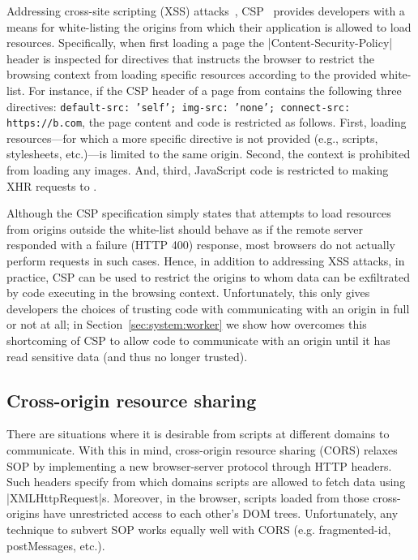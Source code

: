 Addressing cross-site scripting (XSS) attacks~,
CSP~ provides developers with a means for
white-listing the origins from which their application is allowed to
load resources.
%
Specifically, when first loading a page the
\js|Content-Security-Policy| header is inspected for directives that
instructs the browser to restrict the browsing context from loading
specific resources according to the provided white-list.
%
For instance, if the CSP header of a page from  contains
the following three directives:
%
\texttt{default-src: 'self'; img-src: 'none'; connect-src:
https://b.com},
%
the page content and code is restricted as follows.
%
First, loading resources---for which a more specific directive is not
provided (e.g., scripts, stylesheets, etc.)---is limited to the same
origin.
%
Second, the context is prohibited from loading any images.
%
And, third, JavaScript code is restricted to making XHR requests to
.

Although the CSP specification simply states that attempts to load
resources from origins outside the white-list should behave as if the
remote server responded with a failure (HTTP 400) response, most
browsers do not actually perform requests in such cases.
%
Hence, in addition to addressing XSS attacks, in practice, CSP can
be used to restrict the origins to whom data can be exfiltrated by
code executing in the browsing context.
%
Unfortunately, this only gives developers the choices of trusting code
with communicating with an origin in full or not at all;
%
in Section~\ref{sec:system:worker} we show how \sys{} overcomes this
shortcoming of CSP to allow code to communicate with an origin until
it has read sensitive data (and thus no longer trusted).


\subsection{Cross-origin resource sharing } 
\label{sec:background:cors}


There are situations where it is desirable from scripts at different domains to
communicate. With this in mind, cross-origin resource sharing (CORS) relaxes SOP
by implementing a new browser-server protocol through HTTP headers.  Such
headers specify from which domains scripts are allowed to fetch data 
using \js|XMLHttpRequest|s. Moreover, in the browser, scripts loaded from
those cross-origins have unrestricted access to each other's DOM
trees. Unfortunately, any technique to subvert SOP works equally well with CORS 
(e.g. fragmented-id, postMessages, etc.).


